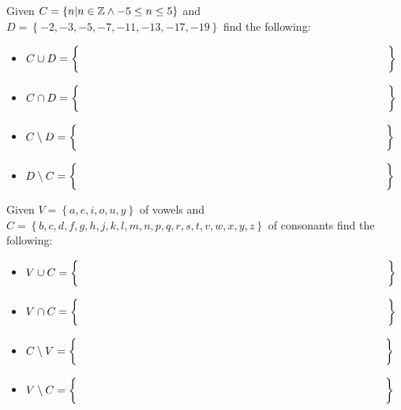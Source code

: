 \begin{practiceprob}
    Given \(C=\left\{n\middle|n\in\mbox{$\mathbb{Z}$}\wedge -5\leq n\leq5\right\}\) and\newline \(D=\left\{-2,-3,-5,-7,-11,-13,-17,-19\right\}\) find the following:
        \begin{itemize}
            \item \(C\cup D=\left\{\phantom{\rule{280pt}{15pt}}\right\}\)
            \item \(C\cap D=\left\{\phantom{\rule{280pt}{15pt}}\right\}\)
            \item \(C\setminus D=\left\{\phantom{\rule{280pt}{15pt}}\right\}\)
            \item \(D\setminus C=\left\{\phantom{\rule{280pt}{15pt}}\right\}\)
        \end{itemize}
\end{practiceprob}
\begin{practiceprob}
    Given \(V=\left\{a,e,i,o,u,y\right\}\) of vowels and\newline \(C=\left\{b,c,d,f,g,h,j,k,l,m,n,p,q,r,s,t,v,w,x,y,z\right\}\) of consonants find the following:
        \begin{itemize}
            \item \(V\cup C=\left\{\phantom{\rule{280pt}{15pt}}\right\}\)
            \item \(V\cap C=\left\{\phantom{\rule{280pt}{15pt}}\right\}\)
            \item \(C\setminus V=\left\{\phantom{\rule{280pt}{15pt}}\right\}\)
            \item \(V\setminus C=\left\{\phantom{\rule{280pt}{15pt}}\right\}\)
        \end{itemize}
\end{practiceprob}

\clearpage

